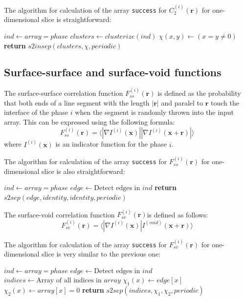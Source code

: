 \documentclass[reprint,amsmath,amssymb,aps,pre]{revtex4-1}
\newcommand{\code}[1]{\colorbox{light-gray}{\texttt{#1}}}
\begin{document}
The algorithm for calculation of the array \code{success} for
$C_2^{(i)}(\bm{r})$ for one-dimensional slice is straightforward:
\begin{algorithmic}[1]
  \State $ind \gets array = phase$ 
  \State $clusters \gets clusterize(ind)$
  \State $\chi(x,y) \gets (x = y \ne 0)$
  \State \textbf{return} $s2insep(clusters, \chi, periodic)$
  \EndProcedure
\end{algorithmic}

\subsection{Surface-surface and surface-void functions}
The surface-surface correlation function $F_{ss}^{(i)}(\bm{r})$ is defined as
the probability that both ends of a line segment with the length $|\bm{r}|$ and
paralel to $\bm{r}$ touch the interface of the phase $i$ when the segment is
randomly thrown into the input array. This can be expressed using the following
formula:
\begin{equation*}
  F_{ss}^{(i)}(\bm{r}) = \langle |\nabla I^{(i)}(\bm{x})| |\nabla I^{(i)}(\bm{x}
  + \bm{r})| \rangle
\end{equation*}
where $I^{(i)}(\bm{x})$ is an indicator function for the phase $i$.

The algorithm for calculation of the array \code{success} for
$F_{ss}^{(i)}(\bm{r})$ for one-dimensional slice is also straightforward:
\begin{algorithmic}[1]
    \State $ind \gets array = phase$ 
    \State $edge \gets \text{Detect edges in $ind$}$
    \State \textbf{return} $s2sep(edge, identity, identity, periodic)$
  \EndProcedure
\end{algorithmic}

The surface-void correlation function $F_{sv}^{(i)}(\bm{r})$is defined as
follows:
\begin{equation*}
  F_{sv}^{(i)}(\bm{r}) = \langle |\nabla I^{(i)}(\bm{x})| I^{(void)}(\bm{x}
  + \bm{r}) \rangle
\end{equation*}

The algorithm for calculation of the array \code{success} for
$F_{sv}^{(i)}(\bm{r})$ for one-dimensional slice is very similar to the previous
one:
\begin{algorithmic}[1]
    \State $ind \gets array = phase$ 
    \State $edge \gets \text{Detect edges in $ind$}$
    \State $indices \gets \text{Array of all indices in $array$}$
    \State $\chi_1(x) \gets edge[x]$
    \State $\chi_2(x) \gets array[x] = 0$ 
    \State \textbf{return} $s2sep(indices, \chi_1, \chi_2, periodic)$
  \EndProcedure
\end{algorithmic}
\end{document}
